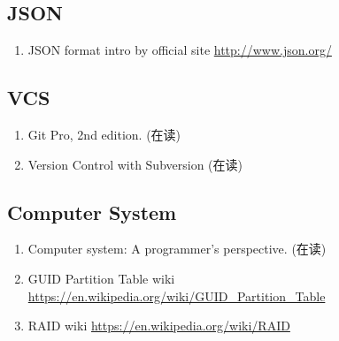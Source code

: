 \documentclass{article}
\begin{document}
\subsection{JSON}
\begin{enumerate}
    \item JSON format intro by official site \url{http://www.json.org/}
\end{enumerate}
\subsection{VCS}
\begin{enumerate}
    \item Git Pro, 2nd edition. (在读)
    \item Version Control with Subversion (在读)
\end{enumerate}
\subsection{Computer System}
\begin{enumerate}
    \item Computer system: A programmer's perspective. (在读)
    \item GUID Partition Table wiki \url{https://en.wikipedia.org/wiki/GUID_Partition_Table}
    \item RAID wiki \url{https://en.wikipedia.org/wiki/RAID}
\end{enumerate}
\end{document}
